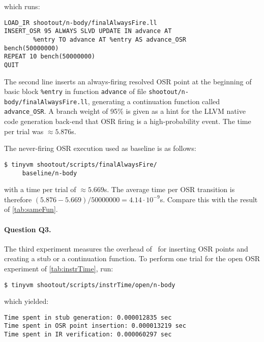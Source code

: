 \noindent which runs:

\begin{small}
\begin{verbatim}
LOAD_IR shootout/n-body/finalAlwaysFire.ll
INSERT_OSR 95 ALWAYS SLVD UPDATE IN advance AT 
        %entry TO advance AT %entry AS advance_OSR
bench(50000000)
REPEAT 10 bench(50000000)
QUIT
\end{verbatim}
\end{small}

\noindent The second line inserts an always-firing resolved OSR point at the beginning of basic block {\tt \%entry} in function {\tt advance} of file {\small\tt shootout/n-body/finalAlwaysFire.ll}, generating a continuation function called {\tt advance\_OSR}. A branch weight of 95\% is given as a hint for the LLVM native code generation back-end that OSR firing is a high-probability event. The time per trial was $\approx5.876$s.

The never-firing OSR execution used as baseline is as follows:
\begin{small}
\begin{verbatim}
$ tinyvm shootout/scripts/finalAlwaysFire/
     baseline/n-body
\end{verbatim}
\end{small}

\noindent with a time per trial of $\approx5.669$s. The average time per OSR transition is therefore $(5.876-5.669)/50000000=4.14\cdot 10^{-9}$s. Compare this with the result of \ref{tab:sameFun}.

\paragraph{Question Q3.} The third experiment measures the overhead of \osrkit\ for inserting OSR points and creating a stub or a continuation function. To perform one trial for the open OSR experiment of \ref{tab:instrTime}, run:
\begin{small}
\begin{verbatim}
$ tinyvm shootout/scripts/instrTime/open/n-body
\end{verbatim}
\end{small}
\noindent which yielded:
\begin{small}
\begin{verbatim}
Time spent in stub generation: 0.000012835 sec
Time spent in OSR point insertion: 0.000013219 sec
Time spent in IR verification: 0.000060297 sec
\end{verbatim}
\end{small}

